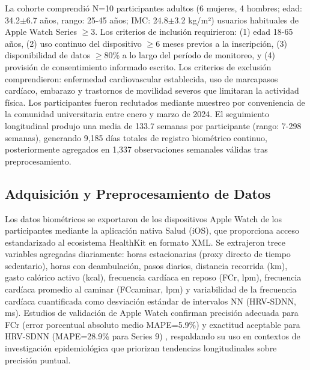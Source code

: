 La cohorte comprendió N=10 participantes adultos (6 mujeres, 4 hombres; edad: 34.2$\pm$6.7 años, rango: 25-45 años; IMC: 24.8$\pm$3.2 kg/m²) usuarios habituales de Apple Watch Series $\geq$3. Los criterios de inclusión requirieron: (1) edad 18-65 años, (2) uso continuo del dispositivo $\geq$6 meses previos a la inscripción, (3) disponibilidad de datos $\geq$80\% a lo largo del período de monitoreo, y (4) provisión de consentimiento informado escrito. Los criterios de exclusión comprendieron: enfermedad cardiovascular establecida, uso de marcapasos cardíaco, embarazo y trastornos de movilidad severos que limitaran la actividad física. Los participantes fueron reclutados mediante muestreo por conveniencia de la comunidad universitaria entre enero y marzo de 2024. El seguimiento longitudinal produjo una media de 133.7 semanas por participante (rango: 7-298 semanas), generando 9,185 días totales de registro biométrico continuo, posteriormente agregados en 1,337 observaciones semanales válidas tras preprocesamiento.

\subsection{Adquisición y Preprocesamiento de Datos}
\label{subsec:adquisicion}

Los datos biométricos se exportaron de los dispositivos Apple Watch de los participantes mediante la aplicación nativa Salud (iOS), que proporciona acceso estandarizado al ecosistema HealthKit en formato XML. Se extrajeron trece variables agregadas diariamente: horas estacionarias (proxy directo de tiempo sedentario), horas con deambulación, pasos diarios, distancia recorrida (km), gasto calórico activo (kcal), frecuencia cardíaca en reposo (FCr, lpm), frecuencia cardíaca promedio al caminar (FCcaminar, lpm) y variabilidad de la frecuencia cardíaca cuantificada como desviación estándar de intervalos NN (HRV-SDNN, ms). Estudios de validación de Apple Watch confirman precisión adecuada para FCr (error porcentual absoluto medio MAPE=5.9\%) y exactitud aceptable para HRV-SDNN (MAPE=28.9\% para Series 9) \cite{OGrady2024AppleWatch,Khushhal2025AppleCardiac}, respaldando su uso en contextos de investigación epidemiológica que priorizan tendencias longitudinales sobre precisión puntual.

